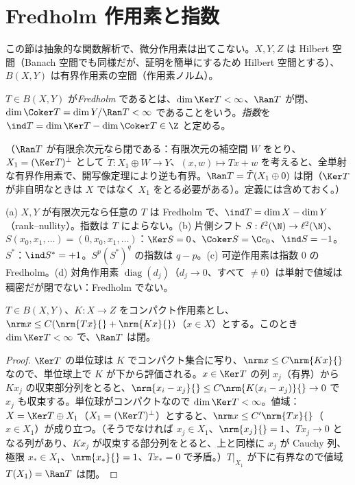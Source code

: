 
\section{Fredholm 作用素と指数}\label{sec:fred}
この節は抽象的な関数解析で、微分作用素は出てこない。$X,Y,Z$ は Hilbert 空間（Banach 空間でも同様だが、証明を簡単にするため Hilbert 空間とする）、$B(X,Y)$ は有界作用素の空間（作用素ノルム）。
\begin{defn}\label{def:fredholm}
$T\in B(X,Y)$ が\emph{Fredholm} であるとは、$\dim\Ker T<\infty$、$\Ran T$ が閉、$\dim\Coker T=\dim Y/\Ran T<\infty$ であることをいう。\emph{指数}を $\ind T=\dim\Ker T-\dim\Coker T\in\Z$ と定める。
\end{defn}
（$\Ran T$ が有限余次元なら閉である：有限次元の補空間 $W$ をとり、$X_1=(\Ker T)^\perp$ として $\tilde T:X_1\oplus W\to Y$、$(x,w)\mapsto Tx+w$ を考えると、全単射な有界作用素で、開写像定理により逆も有界。$\Ran T=\tilde T(X_1\oplus0)$ は閉（$\Ker T$ が非自明なときは $X$ ではなく $X_1$ をとる必要がある）。定義には含めておく。）
\begin{ex}\label{ex:fredex}
(a) $X,Y$ が有限次元なら任意の $T$ は Fredholm で、$\ind T=\dim X-\dim Y$（rank--nullity）。指数は $T$ によらない。(b) 片側シフト $S:\ell^2(\N)\to\ell^2(\N)$、$S(x_0,x_1,\dots)=(0,x_0,x_1,\dots)$：$\Ker S=0$、$\Coker S=\C e_0$、$\ind S=-1$。$S^*$：$\ind S^*=+1$。$S^p(S^*)^q$ の指数は $q-p$。(c) 可逆作用素は指数 $0$ の Fredholm。(d) 対角作用素 $\operatorname{diag}(d_j)$（$d_j\to0$、すべて $\ne0$）は単射で値域は稠密だが閉でない：Fredholm でない。
\end{ex}
\begin{lem}\label{lem:closedrange}\tP
$T\in B(X,Y)$、$K:X\to Z$ をコンパクト作用素とし、$\nrm x{}\le C(\nrm{Tx}{}+\nrm{Kx}{})$（$x\in X$）とする。このとき $\dim\Ker T<\infty$ で、$\Ran T$ は閉。
\end{lem}
\begin{proof}
$\Ker T$ の単位球は $K$ でコンパクト集合に写り、$\nrm x{}\le C\nrm{Kx}{}$ なので、単位球上で $K$ が下から評価される。$x\in\Ker T$ の列 $x_j$（有界）から $Kx_j$ の収束部分列をとると、$\nrm{x_i-x_j}{}\le C\nrm{K(x_i-x_j)}{}\to0$ で $x_j$ も収束する。単位球がコンパクトなので $\dim\Ker T<\infty$。値域：$X=\Ker T\oplus X_1$（$X_1=(\Ker T)^\perp$）とすると、$\nrm x{}\le C'\nrm{Tx}{}$（$x\in X_1$）が成り立つ。（そうでなければ $x_j\in X_1$、$\nrm{x_j}{}=1$、$Tx_j\to0$ となる列があり、$Kx_j$ が収束する部分列をとると、上と同様に $x_j$ が Cauchy 列、極限 $x_*\in X_1$、$\nrm{x_*}{}=1$、$Tx_*=0$ で矛盾。）$T|_{X_1}$ が下に有界なので値域 $T(X_1)=\Ran T$ は閉。
\end{proof}
